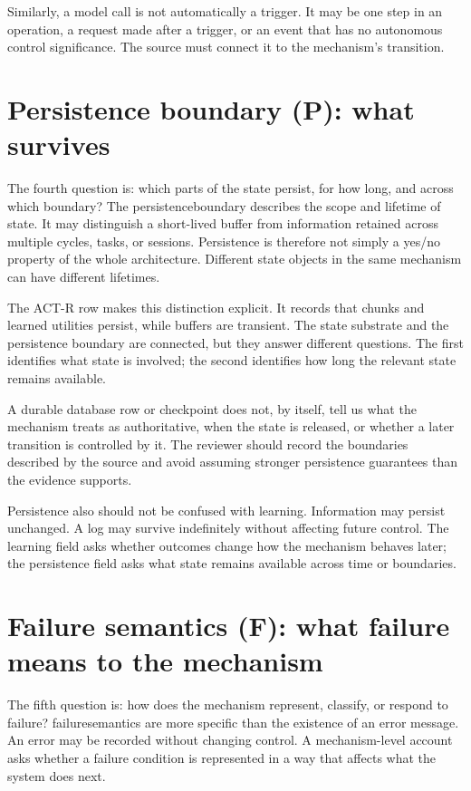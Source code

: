 Similarly, a model call is not automatically a trigger. It may be one step in an operation, a request made after a trigger, or an event that has no autonomous control significance. The source must connect it to the mechanism's transition.

\section{Persistence boundary (P): what survives}
\label{sec:field-persistence}

The fourth question is: which parts of the state persist, for how long, and across which boundary? The \gls{persistenceboundary} describes the scope and lifetime of state. It may distinguish a short-lived buffer from information retained across multiple cycles, tasks, or sessions. Persistence is therefore not simply a yes/no property of the whole architecture. Different state objects in the same mechanism can have different lifetimes.

The ACT-R row makes this distinction explicit. It records that chunks and learned utilities persist, while buffers are transient. The state substrate and the persistence boundary are connected, but they answer different questions. The first identifies what state is involved; the second identifies how long the relevant state remains available.

A durable database row or checkpoint does not, by itself, tell us what the mechanism treats as authoritative, when the state is released, or whether a later transition is controlled by it. The reviewer should record the boundaries described by the source and avoid assuming stronger persistence guarantees than the evidence supports.

Persistence also should not be confused with learning. Information may persist unchanged. A log may survive indefinitely without affecting future control. The learning field asks whether outcomes change how the mechanism behaves later; the persistence field asks what state remains available across time or boundaries.

\section{Failure semantics (F): what failure means to the mechanism}
\label{sec:field-failure}

The fifth question is: how does the mechanism represent, classify, or respond to failure? \Gls{failuresemantics} are more specific than the existence of an error message. An error may be recorded without changing control. A mechanism-level account asks whether a failure condition is represented in a way that affects what the system does next.

